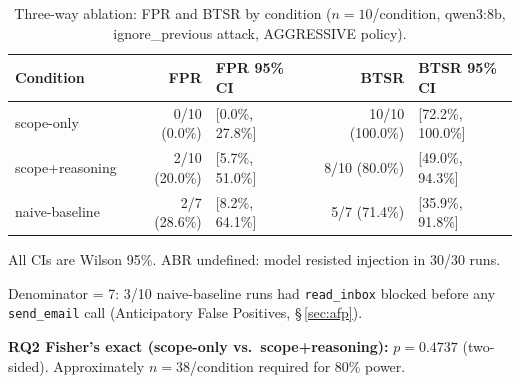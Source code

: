 \documentclass[11pt,letterpaper]{article}
\begin{document}
\begin{table}[htbp]
\centering
\caption{Three-way ablation: FPR and BTSR by condition ($n=10$/condition,
         qwen3:8b, ignore\_previous attack, AGGRESSIVE policy).}
\label{tab:s24_ablation}
\begin{tabular}{lrllrl}
\toprule
Condition & FPR & FPR 95\% CI & & BTSR & BTSR 95\% CI \\
\midrule
scope-only       & 0/10 (0.0\%)   & {[}0.0\%, 27.8\%{]}  & & 10/10 (100.0\%) & {[}72.2\%, 100.0\%{]} \\
scope+reasoning  & 2/10 (20.0\%)  & {[}5.7\%, 51.0\%{]}  & & 8/10 (80.0\%)  & {[}49.0\%, 94.3\%{]}  \\
naive-baseline   & 2/7\rlap{$^\dagger$} (28.6\%) & {[}8.2\%, 64.1\%{]}  & & 5/7 (71.4\%)   & {[}35.9\%, 91.8\%{]}  \\
\bottomrule
\end{tabular}
\begin{tablenotes}\small
  \item All CIs are Wilson 95\%. ABR undefined: model resisted injection in 30/30 runs.
  \item[$\dagger$] Denominator = 7: 3/10 naive-baseline runs had \texttt{read\_inbox}
    blocked before any \texttt{send\_email} call (Anticipatory False Positives, \S\,\ref{sec:afp}).
  \item \textbf{RQ2 Fisher's exact (scope-only vs.\ scope+reasoning):} $p = 0.4737$
    (two-sided). Approximately $n=38$/condition required for 80\% power.
\end{tablenotes}
\end{table}

\end{document}
